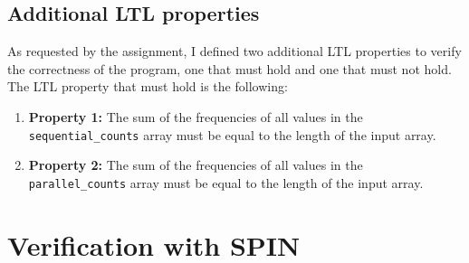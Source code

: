 \documentclass[a4paper, 11pt]{article}
\begin{document}
\subsection{Additional LTL properties}

As requested by the assignment, I defined two additional LTL properties to verify the correctness of the program, one that must hold and one that must not hold. The LTL property that must hold is the following:

\begin{enumerate}
	\item \textbf{Property 1:} The sum of the frequencies of all values in the \texttt{sequential\_counts} array must be equal to the length of the input array.
	\item \textbf{Property 2:} The sum of the frequencies of all values in the \texttt{parallel\_counts} array must be equal to the length of the input array.
\end{enumerate}


\pagebreak

\section{Verification with SPIN}

% 
\end{document}
